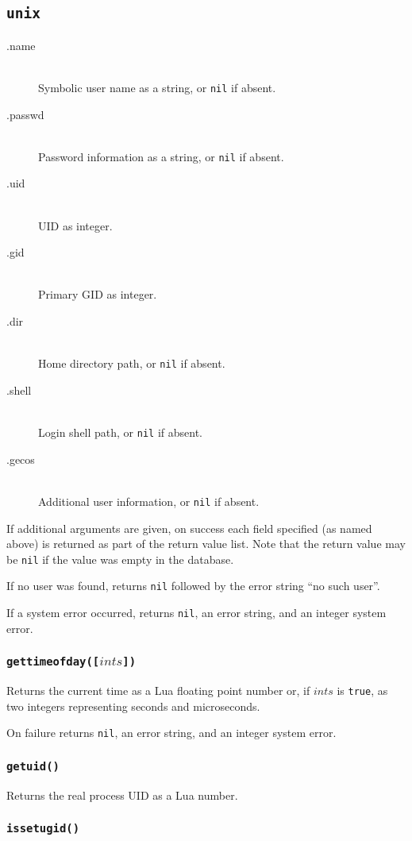 \documentclass[11pt, oneside]{memoir}
\newcommand*{\true}[0]{\texttt{true}\xspace}
\newcommand*{\nil}[0]{\texttt{nil}\xspace}
\newcommand*{\fn}[1]{\texttt{#1}\xspace}
\newcounter{toccols}
\newenvironment{Module}[1]{
	\subsection{\texttt{#1}}
	\addtocontents{toc}{
		\protect\begin{multicols}{\value{toccols}}
	}
}{
	\addtocontents{toc}{\protect\end{multicols}}
}
\begin{document}
\begin{Module}{unix}
\begin{description}
\item[.name] \hfill \\
Symbolic user name as a string, or \nil if absent.
\item[.passwd] \hfill \\
Password information as a string, or \nil if absent.
\item[.uid] \hfill \\
UID as integer.
\item[.gid] \hfill \\
Primary GID as integer.
\item[.dir] \hfill \\
Home directory path, or \nil if absent.
\item[.shell] \hfill \\
Login shell path, or \nil if absent.
\item[.gecos] \hfill \\
Additional user information, or \nil if absent.
\end{description}

If additional arguments are given, on success each field specified (as named above) is returned as part of the return value list. Note that the return value may be \nil if the value was empty in the database.

If no user was found, returns \nil followed by the error string ``no such user''.

If a system error occurred, returns \nil, an error string, and an integer system error.

\subsubsection[\fn{gettimeofday}]{\fn{gettimeofday([$ints$])}}

Returns the current time as a Lua floating point number or, if $ints$ is \true, as two integers representing seconds and microseconds.

On failure returns \nil, an error string, and an integer system error.

\subsubsection[\fn{getuid}]{\fn{getuid()}}

Returns the real process UID as a Lua number.

\subsubsection[\fn{issetugid}]{\fn{issetugid()}}


\end{Module}
\end{document}
